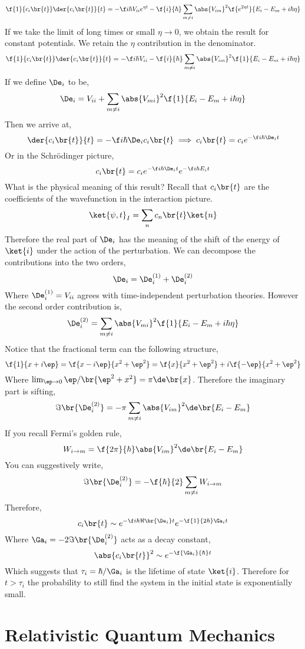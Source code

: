 \documentclass{article}
\begin{document}
\[ \f{1}{c_i\br{t}}\der{c_i\br{t}}{t} = - \f i {\hbar} V_{ii} e^{\eta t} -\f{i}{\hbar} \sum_{m \neq i} \abs{V_{im}}^2 \f{e^{2 \eta t}}{E_i - E_m + i \hbar \eta} \]
If we take the limit of long times or small $\eta \to 0$, we obtain the result for constant potentials. We retain the $\eta$ contribution in the denominator.
\[ \f{1}{c_i\br{t}}\der{c_i\br{t}}{t} = - \f i {\hbar} V_{ii} -\f{i}{\hbar} \sum_{m \neq i} \abs{V_{im}}^2 \f{1}{E_i - E_m + i \hbar \eta} \]
If we define $\De_i$ to be,
\[ \De_i = V_{ii} + \sum_{m \neq i}\abs{V_{mi}}^2 \f{1}{E_i - E_m + i \hbar \eta} \]
Then we arrive at,
\[ \der{c_i\br{t}}{t} = - \f i \hbar \De_i c_i\br{t} \implies c_i\br{t} = c_i e^{- \f i \hbar \De_i t}\]
Or in the Schrödinger picture,
\[  c_i\br{t} = c_i e^{- \f i \hbar \De_i t}e^{-\f i \hbar E_i t} \]
What is the physical meaning of this result? Recall that $c_i\br{t}$ are the coefficients of the wavefunction in the interaction picture.
\[ \ket{\psi, t}_{I} = \sum_{n} c_n\br{t} \ket{n} \]
Therefore the real part of $\De_i$ has the meaning of the shift of the energy of $\ket{i}$ under the action of the perturbation. We can decompose the contributions into the two orders,
\[ \De_i = \De_i^{(1)} + \De_i^{(2)} \]
Where $\De_i^{(1)} = V_{ii}$ agrees with time-independent perturbation theories. However the second order contribution is,
\[\De_i^{(2)} =  \sum_{m \neq i}\abs{V_{mi}}^2 \f{1}{E_i - E_m + i \hbar \eta} \]
Notice that the fractional term can the following structure,
\[ \f{1}{x + i \ep} = \f{x - i \ep}{x^2 + \ep^2} = \f{x}{x^2 + \ep^2} + i \f{-\ep}{x^2 + \ep^2}  \]
Where $\lim_{\ep \to 0} \ep / \br{\ep^2 + x^2} = \pi \de \br{x}$. Therefore the imaginary part is sifting,
\[ \Im\br{\De_i^{(2)}} = - \pi \sum_{m \neq i}\abs{V_{im}}^2\de\br{E_i - E_m} \]
If you recall Fermi's golden rule,
\[ W_{i \to m} = \f{2\pi}{\hbar} \abs{V_{im}}^2 \de\br{E_i - E_m}\]
You can suggestively write,
\[ \Im\br{\De_i^{(2)}} = - \f{\hbar}{2} \sum_{m \neq i}W_{i \to m} \]
Therefore,
\[ c_i\br{t} \sim e^{- \f i \hbar \Re\br{\De_i} t} e^{-\f{1}{2 \hbar} \Ga_i t} \]
Where $\Ga_i = - 2 \Im\br{\De_i^{(2)}}$ acts as a decay constant,
\[ \abs{c_i\br{t}}^2 \sim e^{-\f{\Ga_i}{\hbar} t} \]
Which suggests that $\tau_i = \hbar / \Ga_i$ is the lifetime of state $\ket{i}$. Therefore for $t > \tau_i$ the probability to still find the system in the initial state is exponentially small.

\section{Relativistic Quantum Mechanics}
\end{document}
